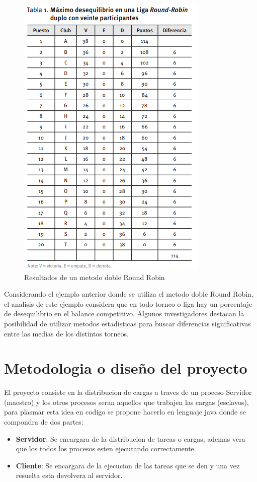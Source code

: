 \documentclass[conference,letterpaper]{IEEEtran}
\begin{document}
\begin{figure}[thpb]
    \centering
    \includegraphics[width=0.55\linewidth]{tabla.png}
    \caption{Resultados de un metodo doble Round Robin}
    \label{fig:tabla}
\end{figure}

Considerando el ejemplo anterior donde se utiliza el metodo doble Round Robin, el analisis de este ejemplo considera que en todo torneo o liga hay un porcentaje de desequilibrio en el balance competitivo. Algunos investigadores destacan la posibilidad de utilizar metodos estadisticas para buscar diferencias significativas entre las medias de los distintos torneos.

\section{Metodologia o diseño del proyecto}
El proyecto consiste en la distribucion de cargas a traves de un proceso Servidor (maestro) y los otros procesos seran aquellos que  trabajen las cargas (esclavos), para plasmar esta idea en codigo se propone hacerlo en lenguaje java donde se compondra de dos partes:

\begin{itemize}
    \item \textbf{Servidor}: Se encargara de la distribucion de tareas o cargas, ademas vera que los todos los procesos esten ejecutando correctamente.
    \item \textbf{Cliente}: Se encargara de la ejecucion de las tareas que se den y una vez resuelta esta devolvera al servidor.
\end{itemize}
\end{document}
